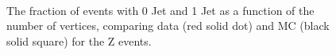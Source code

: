 \begin{figure}[!hbtp]
\centering
{}
\\
\caption{The fraction of events with 0 Jet  and 1 Jet  
as a function of the number of vertices, comparing data (red solid dot) and MC (black solid square) for the Z events. }
\label{fig:jetfrac_z}
\end{figure}



